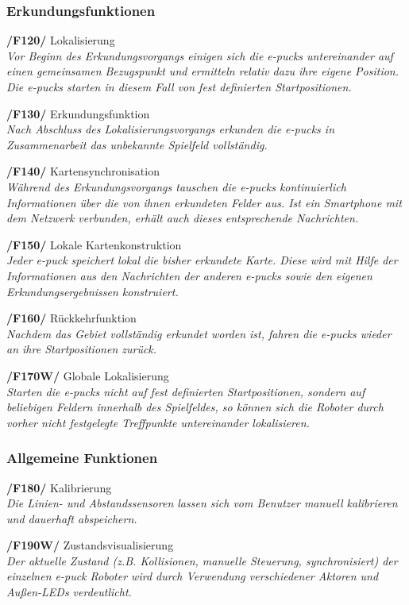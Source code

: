 \documentclass[10pt,a4paper]{article}
\begin{document}
			\subsubsection{Erkundungsfunktionen}
				\begin{list}{}{\leftmargin=1cm}
					\item[\textbf{/F120/}] Lokalisierung
						\\ \textsl{Vor Beginn des Erkundungsvorgangs einigen sich die e-pucks untereinander auf einen gemeinsamen Bezugspunkt
						und ermitteln relativ dazu ihre eigene Position. Die e-pucks starten in diesem Fall von fest definierten Startpositionen.}
					\item[\textbf{/F130/}] Erkundungsfunktion
						\\ \textsl{Nach Abschluss des Lokalisierungsvorgangs erkunden die e-pucks in Zusammenarbeit das unbekannte
							Spielfeld vollständig.}
					\item[\textbf{/F140/}] Kartensynchronisation
						\\ \textsl{Während des Erkundungsvorgangs tauschen die e-pucks kontinuierlich Informationen über die von ihnen
						erkundeten Felder aus. Ist ein Smartphone mit dem Netzwerk verbunden, erhält auch dieses entsprechende Nachrichten.}
					\item[\textbf{/F150/}] Lokale Kartenkonstruktion	
						\\ \textsl{Jeder e-puck speichert lokal die bisher erkundete Karte. Diese wird mit Hilfe
						der Informationen aus den Nachrichten der anderen e-pucks sowie den eigenen Erkundungsergebnissen konstruiert.} 				
					\item[\textbf{/F160/}] Rückkehrfunktion
						\\ \textsl{Nachdem das Gebiet vollständig erkundet worden ist, fahren die e-pucks wieder an ihre Startpositionen
						zurück.}
					\item[\textbf{/F170W/}] Globale Lokalisierung
						\\ \textsl{Starten die e-pucks nicht auf fest definierten Startpositionen, sondern auf beliebigen Feldern innerhalb
							des Spielfeldes, so können sich die Roboter durch vorher nicht festgelegte Treffpunkte untereinander lokalisieren.}
				\end{list}
		\subsubsection{Allgemeine Funktionen}
			\begin{list}{}{\leftmargin=1cm}
				\item[\textbf{/F180/}] Kalibrierung
					\\ \textsl{Die Linien- und Abstandssensoren lassen sich vom Benutzer manuell kalibrieren und dauerhaft abspeichern.}					
				\item[\textbf{/F190W/}] Zustandsvisualisierung		
					\\ \textsl{Der aktuelle Zustand (z.B. Kollisionen, manuelle Steuerung, synchronisiert) der einzelnen e-puck Roboter wird
						durch Verwendung verschiedener Aktoren und Außen-LEDs verdeutlicht.}		
			\end{list}
\end{document}

